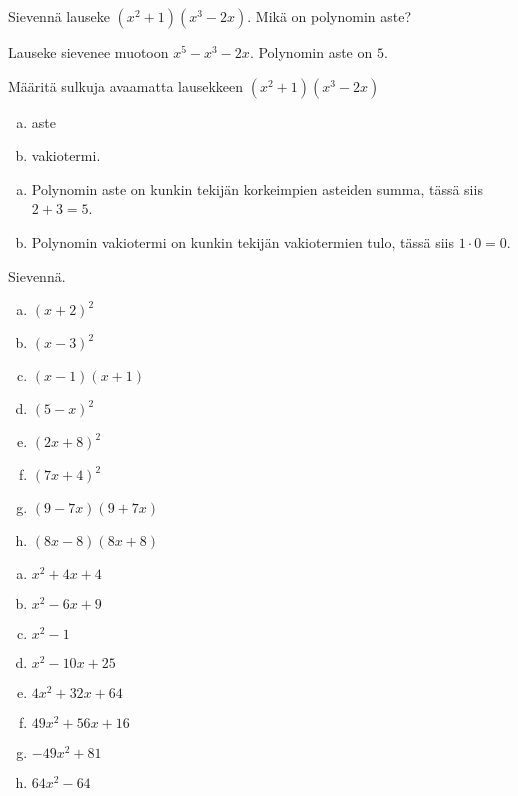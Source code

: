 \begin{tehtava}
    Sievennä lauseke $(x^2+1)(x^3-2x)$. Mikä on polynomin aste?
    \begin{vastaus}
        Lauseke sievenee muotoon $x^5-x^3-2x$. Polynomin aste on $5$.
    \end{vastaus}
\end{tehtava}

\begin{tehtava}
    Määritä sulkuja avaamatta lausekkeen $(x^2+1)(x^3-2x)$ \\
    \begin{enumerate}[a)]
        \item aste
        \item vakiotermi.
    \end{enumerate}
    \begin{vastaus}
        \begin{enumerate}[a)]
            \item Polynomin aste on kunkin tekijän korkeimpien asteiden summa, tässä siis $2+3=5$.
            \item Polynomin vakiotermi on kunkin tekijän vakiotermien tulo, tässä siis $1\cdot 0=0$.
        \end{enumerate}
    \end{vastaus}
\end{tehtava}

\begin{tehtava}
    Sievennä.
    \begin{enumerate}[a)]
        \item $(x+2)^2$
        \item $(x-3)^2$
        \item $(x-1)(x+1)$
        \item $(5-x)^2$
        \item $(2x + 8)^2$
        \item $(7x + 4)^2$
        \item $(9 - 7x)(9 + 7x)$
        \item $(8x - 8)(8x + 8)$
    \end{enumerate}
    \begin{vastaus}
        \begin{enumerate}[a)]
            \item $x^2 + 4x + 4$
            \item $x^2 - 6x + 9$
            \item $x^2 - 1$
            \item $x^2 - 10x + 25$
            \item $4x^2 + 32x + 64$
            \item $49x^2 + 56x + 16$
            \item $-49x^2 + 81$
            \item $64x^2 - 64$
        \end{enumerate}
    \end{vastaus}
\end{tehtava}


